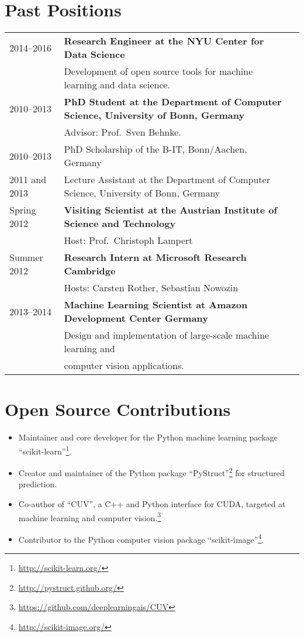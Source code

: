 \documentclass[a4paper,11pt]{article}
\begin{document}
\section{Past Positions}
\begin{tabular}{lll}
    2014--2016 & \textbf{Research Engineer at the NYU Center for Data Science}\\
               & Development of open source tools for machine learning and data science.\\
    2010--2013 & \textbf{PhD Student at the Department of Computer Science, University of Bonn, Germany}\\
         & Advisor: Prof.\ Sven Behnke. \\
    2010--2013 & PhD Scholarship of the B-IT, Bonn/Aachen, Germany\\
    2011 and 2013& Lecture Assistant at the Department of Computer Science, University of Bonn, Germany \\
    Spring 2012 & \textbf{Visiting Scientist at the Austrian Institute of Science and Technology}\\
               & Host: Prof.\ Christoph Lampert\\
    Summer 2012 & \textbf{Research Intern at Microsoft Research Cambridge}\\
               & Hosts: Carsten Rother, Sebastian Nowozin\\
    2013--2014 & \textbf{Machine Learning Scientist at Amazon Development Center Germany}\\
              & Design and implementation of large-scale machine learning and\\
              & computer vision applications.
\end{tabular}

\section{Open Source Contributions}
\begin{itemize}
    \item Maintainer and core developer for the Python machine learning package ``scikit-learn''\footnote{\url{http://scikit-learn.org/}}.
    \item Creator and maintainer of the Python package ``PyStruct''\footnote{\url{http://pystruct.github.org/}} for structured prediction.
    \item Co-author of ``CUV'', a C++ and Python interface for CUDA,
        targeted at machine learning and computer vision.\footnote{\url{https://github.com/deeplearningais/CUV}}
    \item Contributor to the Python computer vision package ``scikit-image''\footnote{\url{http://scikit-image.org/}}.
\end{itemize}
\pagebreak
\end{document}
